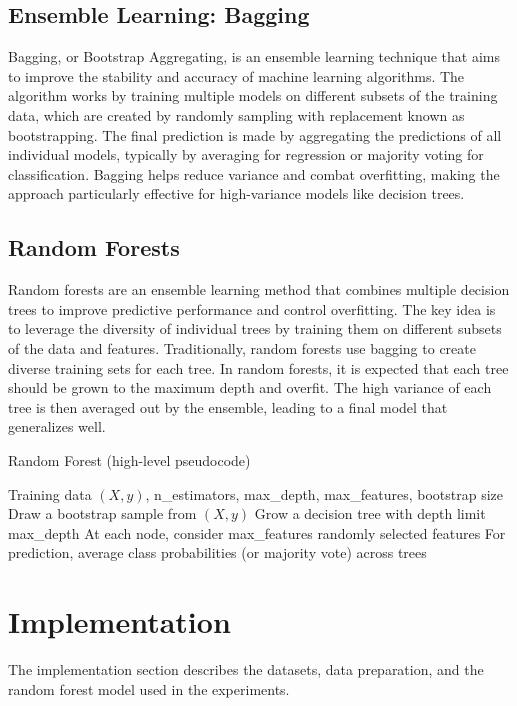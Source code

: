\documentclass[conference]{IEEEtran}
\begin{document}
\subsection{Ensemble Learning: Bagging}
Bagging, or Bootstrap Aggregating, is an ensemble learning technique that aims to improve the stability and accuracy of machine learning algorithms.
 The algorithm works by training multiple models on different subsets of the training data, which are created by randomly sampling with 
 replacement known as bootstrapping. The final prediction is made by aggregating the predictions of all individual models, typically by 
 averaging for regression or majority voting for classification. Bagging helps reduce variance and combat overfitting, making the approach 
 particularly effective for high-variance models like decision trees.

\subsection{Random Forests}

Random forests are an ensemble learning method that combines multiple decision trees to improve predictive performance and control 
overfitting. The key idea is to leverage the diversity of individual trees by training them on different subsets of the data and features. Traditionally,
random forests use bagging to create diverse training sets for each tree. In random forests, it is expected that each tree should be grown
to the maximum depth and overfit. The high variance of each tree is then averaged out by the ensemble, leading to a final model that generalizes well.

\begin{algorithm}[H]
\caption{Random Forest (high-level pseudocode)}
\begin{algorithmic}[1]
\REQUIRE Training data $(X, y)$, n\_estimators, max\_depth, max\_features, bootstrap size
  \STATE Draw a bootstrap sample from $(X, y)$  %
  \STATE Grow a decision tree with depth limit max\_depth
  \STATE At each node, consider max\_features randomly selected features
\ENDFOR
\STATE For prediction, average class probabilities (or majority vote) across trees
\end{algorithmic}
\end{algorithm}


\section{Implementation}
The implementation section describes the datasets, data preparation, and the random forest model used in the experiments.
\end{document}
